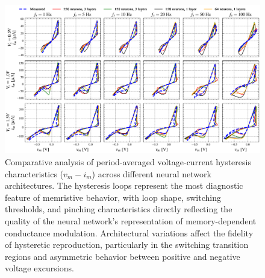 \documentclass[11pt, oneside]{article}
\begin{document}
\begin{figure}[htbp!]
    \centering
    \includegraphics[width=\linewidth]{sample_results/simulated_histeresis.pdf}
    \caption{Comparative analysis of period-averaged voltage-current hysteresis characteristics ($v_m - i_m$) across different neural network architectures. The hysteresis loops represent the most diagnostic feature of memristive behavior, with loop shape, switching thresholds, and pinching characteristics directly reflecting the quality of the neural network's representation of memory-dependent conductance modulation. Architectural variations affect the fidelity of hysteretic reproduction, particularly in the switching transition regions and asymmetric behavior between positive and negative voltage excursions.}
\end{figure}
\end{document}
